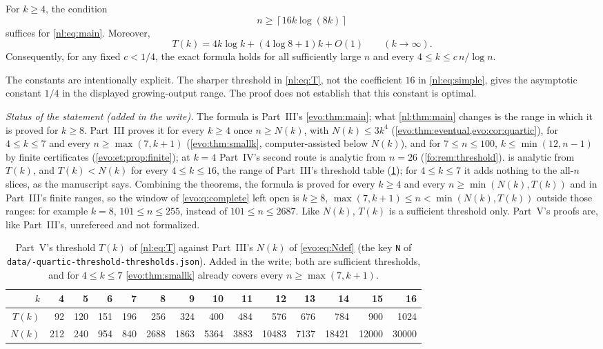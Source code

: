 \documentclass[11pt,a4paper]{article}
\numberwithin{equation}{section}
\theoremstyle{definition}
\theoremstyle{remark}
\newcommand{\nlceil}[1]{\left\lceil #1\right\rceil}
\begin{document}
\begin{corollary}\label{nl:cor:simple}
For $k\ge4$, the condition
\begin{equation}\label{nl:eq:simple}
 n\ge\nlceil{16k\log(8k)}
\end{equation}
suffices for \eqref{nl:eq:main}. Moreover,
\[
 T(k)=4k\log k+(4\log8+1)k+O(1)\qquad(k\longrightarrow\infty).
\]
Consequently, for any fixed $c<1/4$, the exact formula holds for all
sufficiently large $n$ and every $4\le k\le c\,n/\log n$.
\end{corollary}

The constants are intentionally explicit. The sharper threshold in
\eqref{nl:eq:T}, not the coefficient $16$ in \eqref{nl:eq:simple}, gives the
asymptotic constant $1/4$ in the displayed growing-output range.
The proof does not establish that this constant is optimal.

\emph{Status of the statement (added in the write).} The formula is
Part~III's \cref{evo:thm:main}; what \cref{nl:thm:main} changes is the range
in which it is proved for $k\ge8$. Part~III proves it for every $k\ge4$ once
$n\ge N(k)$, with $N(k)\le3k^4$ (\cref{evo:thm:eventual,evo:cor:quartic}),
for $4\le k\le7$ and every $n\ge\max(7,k+1)$ (\cref{evo:thm:smallk},
computer-assisted below $N(k)$), and for $7\le n\le100$,
$k\le\min(12,n-1)$ by finite certificates (\cref{evo:et:prop:finite}); at
$k=4$ Part~IV's second route is analytic from $n=26$
(\cref{fo:rem:threshold}).  is analytic from $T(k)$, and
$T(k)<N(k)$ for every $4\le k\le16$, the range of Part~III's threshold
table (\cref{nl:tab:TN}); for $4\le k\le7$ it adds nothing to the all-$n$
slices, as the manuscript says. Combining the theorems, the formula is
proved for every $k\ge4$ and every $n\ge\min(N(k),T(k))$ and in Part~III's
finite ranges, so the window of \cref{evo:q:complete} left open is
$k\ge8$, $\max(7,k+1)\le n<\min(N(k),T(k))$ outside those ranges: for
example $k=8$, $101\le n\le255$, instead of $101\le n\le2687$. Like $N(k)$,
$T(k)$ is a sufficient threshold only. Part~V's proofs are, like Part~III's,
unrefereed and not formalized.

\begin{table}[htbp]
\centering
\small
\begin{tabular}{@{}rrrrrrrrrrrrrr@{}}
\toprule
$k$ & 4 & 5 & 6 & 7 & 8 & 9 & 10 & 11 & 12 & 13 & 14 & 15 & 16\\\midrule
$T(k)$ & 92 & 120 & 151 & 196 & 256 & 324 & 400 & 484 & 576 & 676 & 784 & 900 & 1024\\
$N(k)$ & 212 & 240 & 954 & 840 & 2688 & 1863 & 5364 & 3883 & 10483 & 7137 & 18421 & 12000 & 30000\\
\bottomrule
\end{tabular}
\caption{Part~V's threshold $T(k)$ of \eqref{nl:eq:T} against Part~III's
$N(k)$ of \eqref{evo:eq:Ndef} (the key \texttt{N} of
\texttt{data/-quartic-threshold-thresholds.json}). Added in the write; both
are sufficient thresholds, and for $4\le k\le7$ \cref{evo:thm:smallk}
already covers every $n\ge\max(7,k+1)$.}\label{nl:tab:TN}
\end{table}
\end{document}
